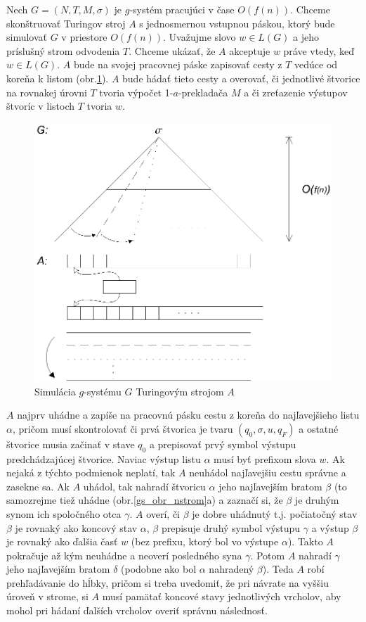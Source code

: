 \begin{dokaz}
Nech $G=(N,T,M,\sigma)$ je $g$-systém pracujúci v čase $O(f(n))$.
Chceme skonštruovať Turingov stroj $A$ s jednosmernou vstupnou
páskou, ktorý bude simulovať $G$ v priestore $O(f(n))$. Uvažujme
slovo $w\in L(G)$ a jeho príslušný strom odvodenia $T$. Chceme
ukázať, že $A$ akceptuje $w$ práve vtedy, keď $w\in L(G)$.  $A$
bude na svojej pracovnej páske zapisovať cesty z $T$ vedúce od
koreňa k listom (obr.\ref{gs_obr_nspace}). $A$ bude hádať tieto cesty a
overovať, či jednotlivé štvorice na rovnakej úrovni $T$ tvoria
výpočet 1-$a$-prekladača $M$ a či zreťazenie výstupov štvoríc v
listoch $T$ tvoria $w$.

\begin{figure}[!ht]
\centering
\includegraphics{./OBRAZKY/GSYSTEMS/NSPACE}
\caption{Simulácia $g$-systému $G$ Turingovým strojom $A$}
\label{gs_obr_nspace}
\end{figure}

$A$ najprv uhádne a zapíše na pracovnú pásku cestu z koreňa do
najľavejšieho listu $\alpha$, pričom musí skontrolovať či prvá
štvorica je tvaru $(q_0,\sigma,u,q_F)$ a ostatné štvorice musia
začinať v stave $q_0$ a prepisovať prvý symbol výstupu
predchádzajúcej štvorice. Naviac výstup listu $\alpha$ musí byť
prefixom slova $w$. Ak nejaká z týchto podmienok neplatí, tak $A$
neuhádol najľavejšiu cestu správne a zasekne sa. Ak $A$ uhádol,
tak nahradí štvoricu $\alpha$ jeho najľavejším bratom $\beta$ (to
samozrejme tiež uhádne (obr.\ref{gs_obr_nstrom}a) a zaznačí si, že
$\beta$ je druhým synom ich spoločného otca $\gamma$. $A$ overí,
či $\beta$ je dobre uhádnutý t.j. počiatočný stav $\beta$ je
rovnaký ako koncový stav $\alpha$,  $\beta$ prepisuje druhý symbol
výstupu $\gamma$ a výstup $\beta$ je rovnaký ako ďalšia časť $w$
(bez prefixu, ktorý bol vo výstupe $\alpha$). Takto $A$ pokračuje
až kým neuhádne a neoverí posledného syna $\gamma$. Potom $A$
nahradí $\gamma$ jeho najľavejším bratom $\delta$ (podobne ako bol
$\alpha$ nahradený $\beta$). Teda $A$ robí prehľadávanie do hĺbky,
pričom si treba uvedomiť, že pri návrate na vyššiu úroveň v
strome, si $A$ musí pamätať koncové stavy jednotlivých vrcholov,
aby mohol pri hádaní ďalších vrcholov overiť správnu následnosť.


\end{dokaz}

